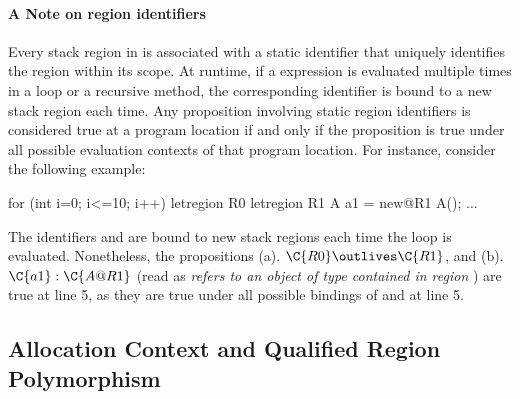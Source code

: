 \paragraph{A Note on region identifiers} Every stack region in \name
is associated with a static identifier that uniquely identifies the
region within its scope. At runtime, if a  expression is
evaluated multiple times in a loop or a recursive method, the
corresponding identifier is bound to a new stack region each time. 
Any proposition involving static region identifiers is
considered true at a program location if and only if the proposition
is true under all possible evaluation contexts of that program
location. For instance, consider the following example:
\begin{numcodejava}
for (int i=0; i<=10; i++) {
  letregion R0 {
    letregion R1 {
      A a1 = new@R1 A();
      ...
    }
  }
}
\end{numcodejava}
The identifiers  and  are bound to new stack regions each
time the loop is evaluated. Nonetheless, the propositions (a). $\C{R0}
\outlives \C{R1}$, and (b). $\C{a1}:\C{A@R1}$ (read as \emph{
refers to an object of type  contained in region }) are
true at line 5, as they are true under all possible bindings of 
and  at line 5.


\subsection{Allocation Context and Qualified Region Polymorphism}
\label{sec:alloc-ctxt}

